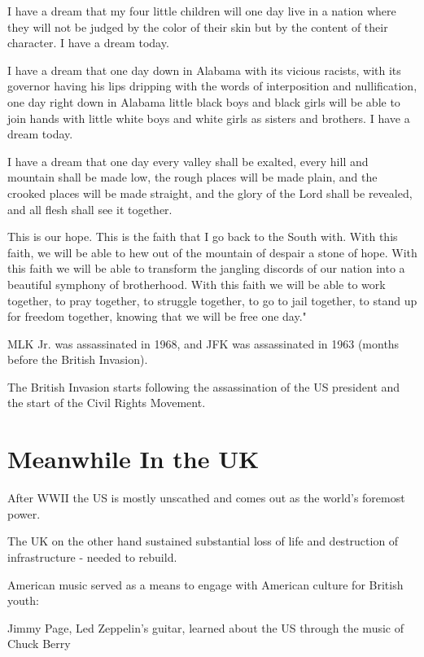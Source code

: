 \documentclass[12pt, a4paper, twoside, openright, titlepage]{book}
\begin{document}
I have a dream that my four little children will one day live in a nation where they will not be judged by the color of their skin but by the content of their character. I have a dream today.

I have a dream that one day down in Alabama with its vicious racists, with its governor having his lips dripping with the words of interposition and nullification, one day right down in Alabama little black boys and black girls will be able to join hands with little white boys and white girls as sisters and brothers. I have a dream today.

I have a dream that one day every valley shall be exalted, every hill and mountain shall be made low, the rough places will be made plain, and the crooked places will be made straight, and the glory of the Lord shall be revealed, and all flesh shall see it together.

This is our hope. This is the faith that I go back to the South with. With this faith, we will be able to hew out of the mountain of despair a stone of hope. With this faith we will be able to transform the jangling discords of our nation into a beautiful symphony of brotherhood. With this faith we will be able to work together, to pray together, to struggle together, to go to jail together, to stand up for freedom together, knowing that we will be free one day."

\begin{note}{}{}
    MLK Jr. was assassinated in 1968, and JFK was assassinated in 1963 (months before the British Invasion).
\end{note}


\begin{rmk}{}{}
    The British Invasion starts following the assassination of the US president and the start of the Civil Rights Movement.
\end{rmk}


\section{Meanwhile In the UK}

\begin{rec}{}{}
    After WWII the US is mostly unscathed and comes out as the world's foremost power.

    The UK on the other hand sustained substantial loss of life and destruction of infrastructure - needed to rebuild.
\end{rec}

\begin{note}{}{}
    American music served as a means to engage with American culture for British youth: \begin{eg}{}{}
        Jimmy Page, Led Zeppelin's guitar, learned about the US through the music of Chuck Berry
    \end{eg}
\end{note}
\end{document}
